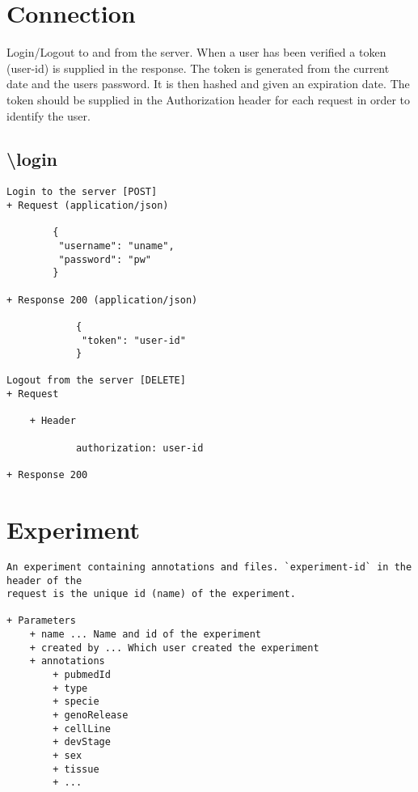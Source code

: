\label{chap:com_api}

\section*{Connection}
Login/Logout to and from the server. When a user has been verified a token (user-id) is supplied in the response. The token is generated from the current date and the users password. It is then hashed and given an expiration date. The token should be supplied in the Authorization header for each request in order to identify the user.

\begin{minipage}{\textwidth}
\subsection*{\textbackslash login}
\begin{verbatim}
Login to the server [POST]
+ Request (application/json)

        {
         "username": "uname", 
         "password": "pw"
        }

+ Response 200 (application/json)
    
            {
             "token": "user-id"
            }

Logout from the server [DELETE]
+ Request

    + Header
    
            authorization: user-id
        
+ Response 200
\end{verbatim}
\end{minipage}

\section*{Experiment}
\begin{verbatim}
An experiment containing annotations and files. `experiment-id` in the header of the 
request is the unique id (name) of the experiment.

+ Parameters
    + name ... Name and id of the experiment
    + created by ... Which user created the experiment
    + annotations 
        + pubmedId
        + type
        + specie
        + genoRelease
        + cellLine
        + devStage
        + sex
        + tissue
        + ...
\end{verbatim}            

